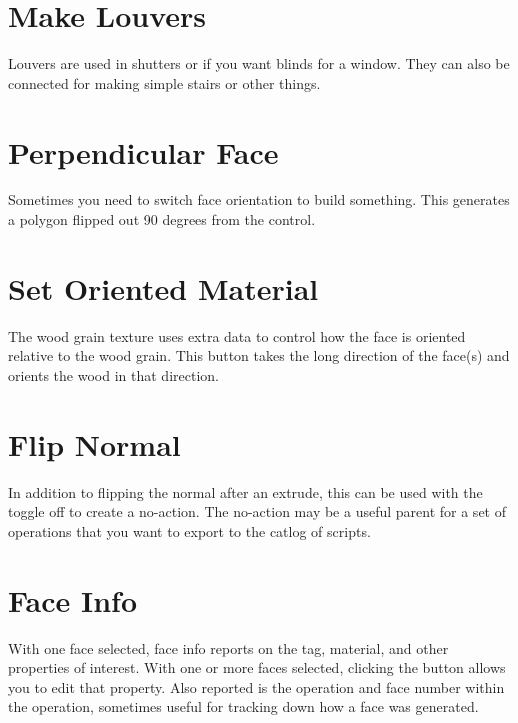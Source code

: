 \documentclass[11pt]{article}
\begin{document}
    \section{Make Louvers}
    Louvers are used in shutters or if you want blinds for a window.
    They can also be connected for making simple stairs or other things.

    \section{Perpendicular Face}
    Sometimes you need to switch face orientation to build something.
    This generates a polygon flipped out 90 degrees from the control.

    \section{Set Oriented Material}
    The wood grain texture uses extra data to control how the face is oriented relative to the wood grain.
    This button takes the long direction of the face(s) and orients the wood in that direction.

    \section{Flip Normal}
    In addition to flipping the normal after an extrude, this can be used with the toggle off to create a no-action.
    The no-action may be a useful parent for a set of operations that you want to export to the catlog of scripts.

    \section{Face Info}
    With one face selected, face info reports on the tag, material, and other properties of interest.
    With one or more faces selected, clicking the button allows you to edit that property.
    Also reported is the operation and face number within the operation, sometimes useful for tracking down how a face
    was generated.
\end{document}
